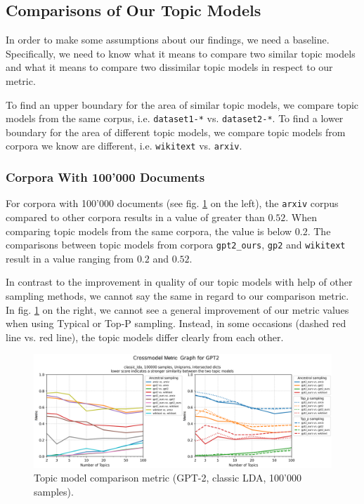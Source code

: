 \subsection{Comparisons of Our Topic Models}\label{sec:comp}
In order to make some assumptions about our findings, we need a baseline. Specifically, we need to know what it means to compare two similar topic models and what it means to compare two dissimilar topic models in respect to our metric. 

To find an upper boundary for the area of similar topic models, we compare topic models from the same corpus, i.e. \texttt{dataset1-*} vs. \texttt{dataset2-*}. To find a lower boundary for the area of different topic models, we compare topic models from corpora we know are different, i.e. \texttt{wikitext} vs. \texttt{arxiv}.

\subsubsection{Corpora With 100'000 Documents}
For corpora with 100'000 documents (see fig. \ref{fig:Unigrams-100000-crossmodel-tt-gpt2-classic_lda-ab-is} on the left), the \texttt{arxiv} corpus compared to other corpora results in a value of greater than $0.52$. When comparing topic models from the same corpora, the value is below $0.2$. The comparisons between topic models from corpora \texttt{gpt2\_ours}, \texttt{gp2} and \texttt{wikitext} result in a value ranging from $0.2$ and $0.52$.

In contrast to the improvement in quality of our topic models with help of other sampling methods, we cannot say the same in regard to our comparison metric. In fig. \ref{fig:Unigrams-100000-crossmodel-tt-gpt2-classic_lda-ab-is} on the right, we cannot see a general improvement of our metric values when using Typical or Top-P sampling. Instead, in some occasions (dashed red line vs. red line), the topic models differ clearly from each other. 
\begin{figure}[H]
    \centering
    \includegraphics[width=1\textwidth]{figures/Unigrams-100000-crossmodel-tt-gpt2-classic_lda-ab-is}
    \caption{Topic model comparison metric (GPT-2, classic LDA, 100'000 samples).}
    \label{fig:Unigrams-100000-crossmodel-tt-gpt2-classic_lda-ab-is}
\end{figure}

